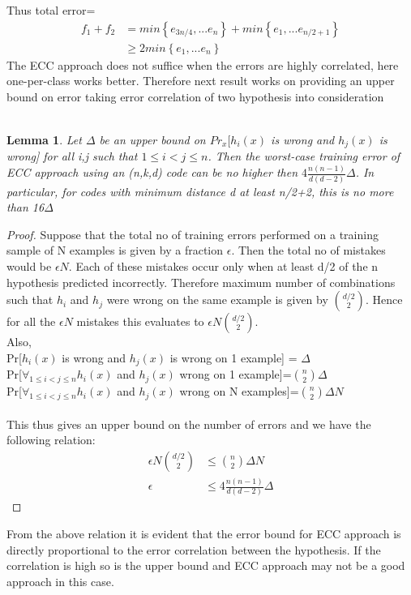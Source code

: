 \documentclass[11pt]{article}
\newtheorem{lemma}[theorem]{Lemma}
\begin{document}
    Thus total error=
    \begin{align*}
        f_1+f_2 &= min\left\{e_{3n/4},...e_n\right\}+min\left\{e_{1},...e_{n/2+1}\right\}\\
            &\geq 2  min\left\{e_1,...e_n\right\}
    \end{align*}
    The ECC approach does not suffice when the errors are highly correlated, here one-per-class works better. Therefore next result works on providing an upper bound on error taking error correlation of two hypothesis into consideration\\\\
    \begin{lemma} 
        Let $\Delta$ be an upper bound on $Pr_x[h_i(x)$ is wrong and $h_j(x)$ is wrong] for all i,j such that $1 \leq i <j \leq n$. Then the worst-case training error of ECC approach using an (n,k,d) code can be no higher then $4\frac{n(n-1)}{d(d-2)}\Delta$. In particular, for codes with minimum distance d at least n/2+2, this is no more than 16$\Delta$\\
    \end{lemma} 
     \begin{proof}
        Suppose that the total no of training errors performed on a training sample of N examples is given by a fraction $\epsilon$. Then the total no of mistakes would be $\epsilon N$. Each of these mistakes occur only when at least d/2 of the n hypothesis predicted incorrectly. Therefore maximum number of combinations such that $h_i$ and $h_j$ were wrong on the same example is given by $d/2 \choose 2$. Hence for all the $\epsilon N$ mistakes this evaluates to $\epsilon N {d/2 \choose 2}$.\\
        Also,\\
        Pr[$h_i(x)$ is wrong and $h_j(x)$ is wrong on 1 example] = $\Delta$\\
        Pr[$\forall_{1\leq i < j \leq n} h_i(x)$ and $h_j(x)$ wrong on 1 example]=${n \choose 2} \Delta$\\
        Pr[$\forall_{1\leq i < j \leq n} h_i(x)$ and $h_j(x)$ wrong on N examples]=${n \choose 2} \Delta N$\\\\
        This thus gives an upper bound on the number of errors and we have the following relation:
        \begin{align*}
            \epsilon N {d/2 \choose 2} &\leq {n \choose 2} \Delta N\\
            \epsilon &\leq 4\frac{n(n-1)}{d(d-2)}\Delta
        \end{align*}
    \end{proof}
    From the above relation it is evident that the error bound for ECC approach is directly proportional to the error correlation between the hypothesis. If the correlation is high so is the upper bound and ECC approach may not be a good approach in this case.
\normalfont
    
\end{document}
